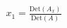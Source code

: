 \documentclass[preview]{standalone}
\begin{document}
\begin{align*}
x_1 = \frac{\text{Det}(A_x)}{\text{Det}(A)}
\end{align*}
\end{document}
